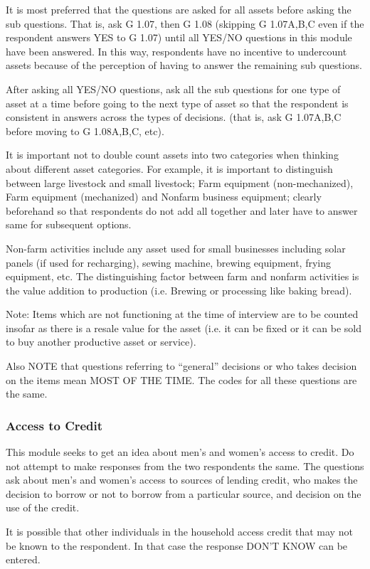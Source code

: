 \documentclass[a4paper]{refart}
\begin{document}
It is most preferred that the questions are asked for all assets before asking the sub questions. That is, ask G 1.07, then G 1.08 (skipping G 1.07A,B,C even if the respondent answers YES to G 1.07) until all YES/NO questions in this module have been answered. In this way, respondents have no incentive to undercount assets because of the perception of having to answer the remaining sub questions.

After asking all YES/NO questions, ask all the sub questions for one type of asset at a time before going to the next type of asset so that the respondent is consistent in answers across the types of decisions. (that is, ask G 1.07A,B,C before moving to G 1.08A,B,C, etc).

It is important not to double count assets into two categories when thinking about different asset categories. For example, it is important to distinguish between large livestock and small livestock; Farm equipment (non-mechanized), Farm equipment (mechanized) and Nonfarm business equipment; clearly beforehand so that respondents do not add all together and later have to answer same for subsequent options.

Non-farm activities include any asset used for small businesses including solar panels (if used for recharging), sewing machine, brewing equipment, frying equipment, etc. The distinguishing factor between farm and nonfarm activities is the value addition to production (i.e. Brewing or processing like baking bread).

Note: Items which are not functioning at the time of interview are to be counted insofar as there is a resale value for the asset (i.e. it can be fixed or it can be sold to buy another productive asset or service).

Also NOTE that questions referring to ``general'' decisions or who takes decision on the items mean MOST OF THE TIME. The codes for all these questions are the same.


\subsubsection{Access to Credit}
This module seeks to get an idea about men's and women's access to credit. Do not attempt to make responses from the two respondents the same.
The questions ask about men's and women's access to sources of lending credit, who makes the decision to borrow or not to borrow from a particular source, and decision on the use of the credit.

It is possible that other individuals in the household access credit that may not be known to the respondent. In that case the response DON'T KNOW can be entered.
\end{document}
